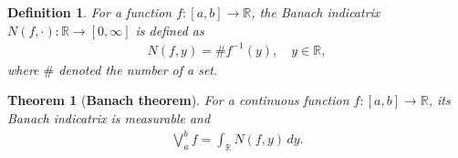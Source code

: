 \documentclass[11pt]{book}
\newtheorem{definition}{Definition}[chapter]
\newtheorem{theorem}{Theorem}[chapter]
\theoremstyle{definition}
\numberwithin{equation}{chapter}
\begin{document}
\medskip

\begin{definition}
For a function $f:[a,b] \to \mathbb{R}$, the Banach indicatrix $N(f,\cdot):\mathbb{R} \to [0,\infty]$ is defined as 
\begin{align*}
    N(f,y) = \# f^{-1}(y), \quad y \in \mathbb{R},
\end{align*}
where $\#$ denoted the number of a set.
\end{definition}

\medskip

\begin{theorem}[{\bf Banach theorem}]
For a continuous function $f:[a,b] \to \mathbb{R}$, its Banach indicatrix is measurable and
\begin{align*}
    \bigvee^b_a f = \int_{\mathbb{R}} N(f,y) \,dy.
\end{align*}
\end{theorem}
\end{document}
